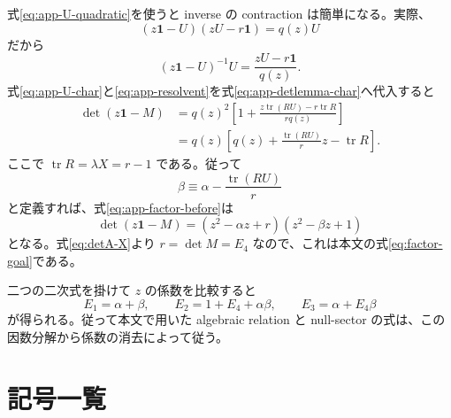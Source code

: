 \documentclass[a4paper,11pt]{ltjsreport}
\newcommand{\tr}{\operatorname{tr}}
\newcommand{\Id}{\mathbf 1}
\begin{document}
式\eqref{eq:app-U-quadratic}を使うと inverse の contraction は簡単になる。実際、
\begin{equation}
 (z\Id-U)(zU-r\Id)=q(z)U
\end{equation}
だから
\begin{equation}
 (z\Id-U)^{-1}U=\frac{zU-r\Id}{q(z)}.
 \label{eq:app-resolvent}
\end{equation}
式\eqref{eq:app-U-char}と\eqref{eq:app-resolvent}を式\eqref{eq:app-detlemma-char}へ代入すると
\begin{align}
 \det(z\Id-M)
 &=q(z)^2\left[
 1+\frac{z\tr(RU)-r\tr R}{r q(z)}
 \right]\nonumber\\
 &=q(z)\left[
 q(z)+\frac{\tr(RU)}{r}z-\tr R
 \right].
 \label{eq:app-factor-before}
\end{align}
ここで $\tr R=\lambda X=r-1$ である。従って
\begin{equation}
 \beta\equiv\alpha-\frac{\tr(RU)}{r}
 \label{eq:app-beta}
\end{equation}
と定義すれば、式\eqref{eq:app-factor-before}は
\begin{equation}
 \det(z\Id-M)
 =(z^2-\alpha z+r)(z^2-\beta z+1)
 \label{eq:app-char-factor-final}
\end{equation}
となる。式\eqref{eq:detA-X}より $r=\det M=E_4$ なので、これは本文の式\eqref{eq:factor-goal}である。

二つの二次式を掛けて $z$ の係数を比較すると
\begin{equation}
 E_1=\alpha+\beta,
 \qquad
 E_2=1+E_4+\alpha\beta,
 \qquad
 E_3=\alpha+E_4\beta
\end{equation}
が得られる。従って本文で用いた algebraic relation と null-sector の式は、この因数分解から係数の消去によって従う。

\chapter{記号一覧}
\end{document}
